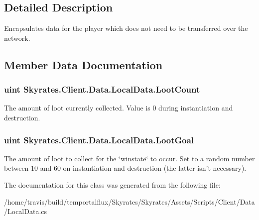 \subsection{Detailed Description}
Encapsulates data for the player which does not need to be transferred over the network. 



\subsection{Member Data Documentation}
\hypertarget{class_skyrates_1_1_client_1_1_data_1_1_local_data_aa073e9045fbadc0325944e19305c92e0}{
\subsubsection[{Loot\-Count}]{\setlength{\rightskip}{0pt plus 5cm}uint Skyrates.\-Client.\-Data.\-Local\-Data.\-Loot\-Count}}\label{class_skyrates_1_1_client_1_1_data_1_1_local_data_aa073e9045fbadc0325944e19305c92e0}


The amount of loot currently collected. Value is 0 during instantiation and destruction. 

\hypertarget{class_skyrates_1_1_client_1_1_data_1_1_local_data_a5e0d6c1ab2838d69f03d3d1dbbe31450}{
\subsubsection[{Loot\-Goal}]{\setlength{\rightskip}{0pt plus 5cm}uint Skyrates.\-Client.\-Data.\-Local\-Data.\-Loot\-Goal}}\label{class_skyrates_1_1_client_1_1_data_1_1_local_data_a5e0d6c1ab2838d69f03d3d1dbbe31450}


The amount of loot to collect for the \char`\"{}winstate\char`\"{} to occur. Set to a random number between 10 and 60 on instantiation and destruction (the latter isn't necessary). 



The documentation for this class was generated from the following file\-:\begin{DoxyCompactItemize}
\item 
/home/travis/build/temportalflux/\-Skyrates/\-Skyrates/\-Assets/\-Scripts/\-Client/\-Data/Local\-Data.\-cs\end{DoxyCompactItemize}
